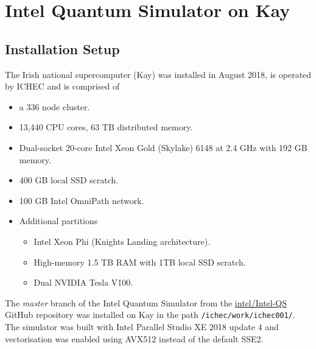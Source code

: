 \section{Intel Quantum Simulator on Kay}
\label{sec:intel_quantum_simulator_on_kay}

\subsection{Installation Setup}
\label{sec:installation_setup}
The Irish national supercomputer (Kay) was installed in August 2018, is operated by ICHEC and is comprised of
\begin{itemize}
    \item a 336 node cluster.
    \item 13,440 CPU cores, 63 TB distributed memory.
    \item Dual-socket 20-core Intel Xeon Gold (Skylake) 6148 at 2.4 GHz with 192 GB memory.
    \item 400 GB local SSD scratch.
    \item 100 GB Intel OmniPath network.
    \item Additional partitions
    \begin{itemize}
        \item Intel Xeon Phi (Knights Landing architecture).
        \item High-memory 1.5 TB RAM with 1TB local SSD scratch.
        \item Dual NVIDIA Tesla V100.
    \end{itemize}
\end{itemize}

The \textit{master} branch of the Intel Quantum Simulator from the \href{https://github.com/intel/Intel-QS/tree/master}{intel/Intel-QS} GitHub repository was installed on Kay in the path \texttt{/ichec/work/ichec001/}. The simulator was built with Intel Parallel Studio XE 2018 update 4 and vectorisation was enabled using AVX512 instead of the default SSE2.

